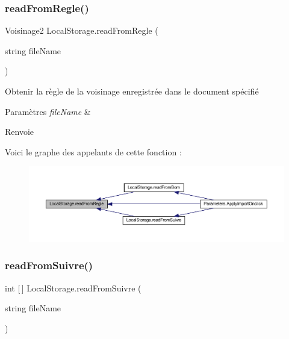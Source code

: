 \subsubsection{\texorpdfstring{read\+From\+Regle()}{readFromRegle()}}
{\footnotesize\ttfamily Voisinage2 Local\+Storage.\+read\+From\+Regle (\begin{DoxyParamCaption}\item[{string}]{file\+Name }\end{DoxyParamCaption})\hspace{0.3cm}{\ttfamily [inline]}}



Obtenir la règle de la voisinage enregistrée dans le document spécifié 


\begin{DoxyParams}{Paramètres}
{\em file\+Name} & \\
\hline
\end{DoxyParams}
\begin{DoxyReturn}{Renvoie}

\end{DoxyReturn}
Voici le graphe des appelants de cette fonction \+:
\nopagebreak
\begin{figure}[H]
\begin{center}
\leavevmode
\includegraphics[width=350pt]{class_local_storage_afbd7328c28fa47b11fcc174da3cc8ec1_icgraph}
\end{center}
\end{figure}
\mbox{\label{class_local_storage_a0c0003569be45cff5fda794e42243c1e}} 
\subsubsection{\texorpdfstring{read\+From\+Suivre()}{readFromSuivre()}}
{\footnotesize\ttfamily int \mbox{[}$\,$\mbox{]} Local\+Storage.\+read\+From\+Suivre (\begin{DoxyParamCaption}\item[{string}]{file\+Name }\end{DoxyParamCaption})\hspace{0.3cm}{\ttfamily [inline]}}



